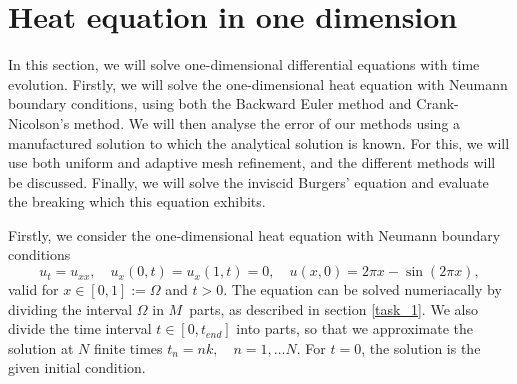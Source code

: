 \section{Heat equation in one dimension}
In this section, we will solve one-dimensional differential equations with time evolution. 
Firstly, we will solve the one-dimensional heat equation with Neumann boundary conditions, using both the Backward Euler method and Crank-Nicolson's method.
We will then analyse the error of our methods using a manufactured solution to which the analytical solution is known.
For this, we will use both uniform and adaptive mesh refinement, and the different methods will be discussed.
Finally, we will solve the inviscid Burgers' equation and evaluate the breaking which this equation exhibits.

Firstly, we consider the one-dimensional heat equation with Neumann boundary conditions
\begin{equation*}
    u_t = u_{xx}, \quad u_x(0,t) = u_x(1,t) = 0, \quad u(x,0) = 2\pi x - \sin(2\pi x),
\end{equation*}
valid for $x \in [0,1] := \Omega$ and $t > 0$.
The equation can be solved numeriacally by dividing the interval $\Omega$ in $M$ parts, as described in section \ref{task_1}.
We also divide the time interval $t \in [0,t_{end}]$ into parts, so that we approximate the solution at $N$ finite times $t_n = nk, \quad n = 1, \ldots N$.
For $t = 0$, the solution is the given initial condition.

\begin{figure}[h]
    \centering
    
\end{figure}


\begin{figure}[ht]
    \centering
    
\end{figure}

\begin{figure}[ht]
    \centering
    
\end{figure}


%


